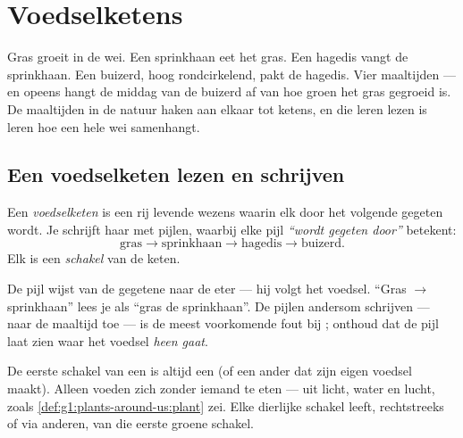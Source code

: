 \chapter{Voedselketens}\label{ch:g3:food-chains}

Gras groeit in de wei. Een sprinkhaan eet het gras. Een hagedis vangt
de sprinkhaan. Een buizerd, hoog rondcirkelend, pakt de hagedis. Vier
maaltijden --- en opeens hangt de middag van de buizerd af van hoe
groen het gras gegroeid is. De maaltijden in de natuur haken aan elkaar
tot ketens, en die leren lezen is leren hoe een hele wei samenhangt.

\section{Een voedselketen lezen en schrijven}

\begin{definition}[Voedselketen]\label{def:g3:food-chains:chain}
Een \emph{voedselketen} is een rij levende wezens
waarin elk door het volgende gegeten wordt. Je schrijft haar met
pijlen, waarbij elke pijl \emph{``wordt gegeten door''}
betekent:
\[
\text{gras} \longrightarrow \text{sprinkhaan}
\longrightarrow \text{hagedis} \longrightarrow \text{buizerd}.
\]
Elk  is een \emph{schakel} van de keten.
\end{definition}

\begin{remark}\label{rem:g3:food-chains:arrow}
De pijl wijst van de gegetene naar de eter --- hij volgt het voedsel.
``Gras $\rightarrow$ sprinkhaan'' lees je als ``gras 
de sprinkhaan''. De pijlen andersom schrijven --- naar de maaltijd toe
--- is de meest voorkomende fout bij ; onthoud dat de pijl
laat zien waar het voedsel \emph{heen gaat}.
\end{remark}

\begin{proposition}\label{prop:g3:food-chains:start}
De eerste schakel van een  is altijd een  (of een
ander  dat zijn eigen voedsel maakt). Alleen  voeden
zich zonder iemand te eten --- uit licht, water en lucht, zoals
\cref{def:g1:plants-around-us:plant} zei. Elke dierlijke schakel leeft,
rechtstreeks of via anderen, van die eerste groene schakel.
\end{proposition}
\admitted


